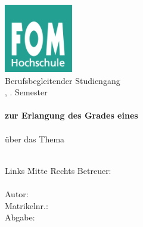 \documentclass[12pt,oneside,titlepage,listof=totoc,bibliography=totoc]{scrartcl}
\begin{document}
\renewcommand{\refname}{Literaturverzeichnis}		%

\begin{titlepage}
	\begin{center}
		\textbf{\myHochschulName}\\
		\vspace{1cm}
			\includegraphics[width=3cm]{abbildungen/fomLogo.jpg} \\
		\vspace{1cm}
		Berufsbegleitender Studiengang\\
		\myStudiengang, \mySemesterZahl. Semester\\
		\vspace{1.5cm}
		\textbf{\myThesisArt}\\
		\textbf{zur Erlangung des Grades eines}\\
		\textbf{\myAkademischerGrad}\\
		\vspace{1.5cm}
		über das Thema\\
		\Huge{\myTitel}\\
		\vspace{0.2cm}
	\end{center}
	\normalsize
	\vfill
	\begin{tabbing}
		Links \= Mitte \= Rechts\kill
		Betreuer: \> \> \myBetreuer\\
		\> \> \\
		Autor: \> \> \myAutor\\
		\> \> Matrikelnr.: \myMatrikelNr\\
		Abgabe: \> \> \myAbgabeDatum
	\end{tabbing}
\end{titlepage}



\tableofcontents
\newpage
\end{document}

